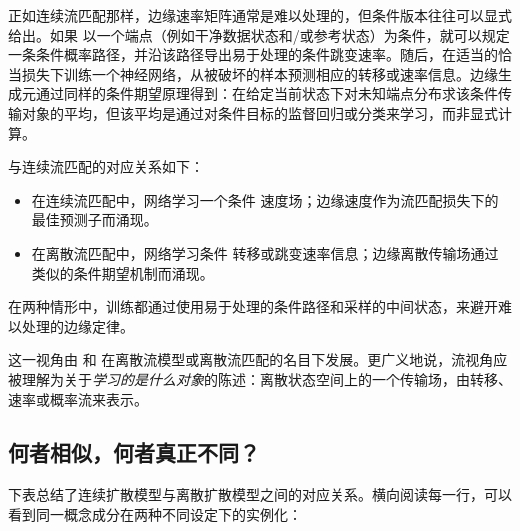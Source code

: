 正如连续流匹配那样，边缘速率矩阵通常是难以处理的，但条件版本往往可以显式给出。如果
以一个端点（例如干净数据状态和/或参考状态）为条件，就可以规定一条条件概率路径，并沿该路径导出易于处理的条件跳变速率。随后，在适当的恰当损失下训练一个神经网络，从被破坏的样本预测相应的转移或速率信息。边缘生成元通过同样的条件期望原理得到：在给定当前状态下对未知端点分布求该条件传输对象的平均，但该平均是通过对条件目标的监督回归或分类来学习，而非显式计算。

与连续流匹配的对应关系如下：
\begin{itemize}[leftmargin=2em]
    \item 在连续流匹配中，网络学习一个条件
      速度场；边缘速度作为流匹配损失下的最佳预测子而涌现。
    \item 在离散流匹配中，网络学习条件
      转移或跳变速率信息；边缘离散传输场通过类似的条件期望机制而涌现。
\end{itemize}
在两种情形中，训练都通过使用易于处理的条件路径和采样的中间状态，来避开难以处理的边缘定律。

这一视角由 \citet{campbell2024generative} 和
\citet{gat2024discrete} 在离散流模型或离散流匹配的名目下发展。更广义地说，流视角应被理解为关于\emph{学习的是什么对象}的陈述：离散状态空间上的一个传输场，由转移、速率或概率流来表示。

\subsection{何者相似，何者真正不同？}
\label{subsec:epilogue-genuine-diff}

下表总结了连续扩散模型与离散扩散模型之间的对应关系。横向阅读每一行，可以看到同一概念成分在两种不同设定下的实例化：

